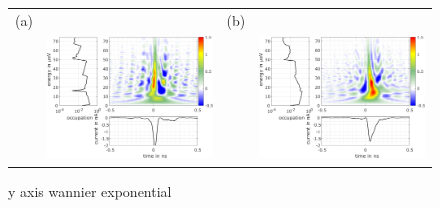 \begin{figure}[hptb]
	\begin{center}
		\begin{tabular}{c c c c}
			(a) & & (b) & \\ 
			& \includegraphics[width = 6.5 cm]{./appC/wannierwigData_exponential_50ps_1e_JMAP_f_vf-el-moins-y} & & \includegraphics[width = 6.5 cm]{./appC/wannierwigData_exponential_50ps_1e_JMAP_f_vf-el-plus-y}
		\end{tabular}
	\end{center}
	
	\caption{y axis wannier exponential}
	\label{fig: y axis wannier exponential}
\end{figure}

